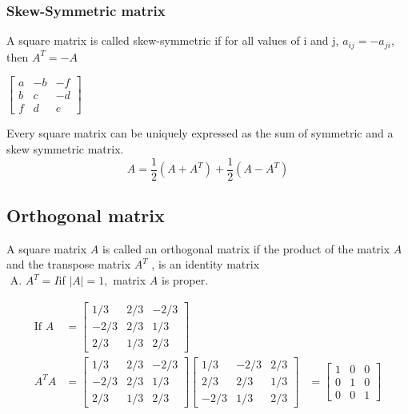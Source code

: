 \subsubsection{Skew-Symmetric matrix}
A square matrix is called skew-symmetric if for all values of i and j, $a_{i j}=-a_{j i}$, then $A^{T}=-A$ 
\begin{example} $\left[\begin{array}{ccc}a & -b & -f\\ b & c & -d \\ f & d & e\end{array}\right]$	 
\end{example}
\begin{note}
Every square matrix can be uniquely expressed as the sum of symmetric and a skew symmetric matrix.$$  A=\frac{1}{2}(A+A^{T})+\frac{1}{2}(A-A^{T})$$	
\end{note}
\subsection{Orthogonal matrix}
 A square matrix $A$ is called an orthogonal matrix if the product of the matrix $A$ and the transpose matrix $A^{T}$ , is an identity matrix 
\\$
\text { A. } A^{T}=I
$\hspace{1cm}if $|A|=1,$ matrix $A$ is proper.
\begin{example}
	$$\begin{aligned}
		\text{If  }A&=\left[\begin{array}{ccc}1 / 3 & 2 / 3 & -2 / 3 \\ -2 / 3 & 2 / 3 & 1 / 3 \\ 2 / 3 & 1 / 3 & 2 / 3\end{array}\right]\\
	A^{T} A&=\left[\begin{array}{ccc}1 / 3 & 2 / 3 & -2 / 3 \\ -2 / 3 & 2 / 3 & 1 / 3 \\ 2 / 3 & 1 / 3 & 2 / 3\end{array}\right]\left[\begin{array}{ccc}1 / 3 & -2 / 3 & 2 / 3 \\ 2 / 3 & 2 / 3 & 1 / 3 \\ -2 / 3 & 1 / 3 & 2 / 3\end{array}\right]&=\left[\begin{array}{ccc}1 & 0 & 0 \\ 0 & 1 & 0 \\ 0 & 0 & 1\end{array}\right]
	\end{aligned}$$
	

	\end{example}
